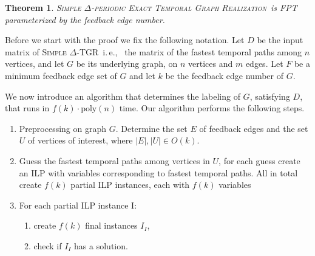 \documentclass[11pt,a4paper]{article}
\newtheorem{theorem}{Theorem}
\theoremstyle{remark}
\theoremstyle{definition}
\newcommand{\ie}{i.\,e.,\ }
\newcommand{\deltaExactLong}{\textsc{Simple $\Delta$-periodic Exact Temporal Graph Realization}}
\newcommand{\deltaExact}{\textsc{Simple $\Delta$-TGR}}
\begin{document}
\begin{theorem}\label{thm:FPTwrtFES}
    \deltaExactLong\ is FPT parameterized by the feedback edge number.
\end{theorem}

Before we start with the proof we fix the following notation. 
Let $D$ be the input matrix of \deltaExact\ \ie
the matrix of the fastest temporal paths among $n$ vertices, and let $G$ be its underlying graph, on $n$ vertices and $m$ edges.
Let $F$ be a minimum feedback edge set of $G$ and let $k$ be the feedback edge number of $G$.

We now introduce an algorithm that determines the labeling of $G$, satisfying $D$, that runs in $f(k) \cdot \text{poly}(n)$ time.
Our algorithm performs the following steps.
\begin{enumerate}
    \item Preprocessing on graph $G$. Determine the set $E$ of feedback edges and the set $U$ of vertices of interest, where $|E|, |U| \in O(k)$.
    \item Guess the fastest temporal paths among vertices in $U$, for each guess create an ILP with variables corresponding to fastest temporal paths.
    All in total create $f(k)$ partial ILP instances, each with $f(k)$ variables
    \item For each partial ILP instance I:
    \begin{enumerate}
        \item create $f(k)$ final instances $I_I$,
        \item check if $I_I$ has a solution.
    \end{enumerate}
\end{enumerate}
\end{document}
